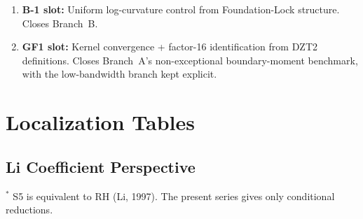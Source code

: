 \documentclass[12pt,a4paper]{article}
\theoremstyle{definition}
\theoremstyle{remark}
\begin{document}
\begin{enumerate}
  \item \textbf{B-1 slot:} Uniform log-curvature control from
    Foundation-Lock structure. Closes Branch~B.
  \item \textbf{GF1 slot:} Kernel convergence + factor-16 identification
    from DZT2 definitions. Closes Branch~A's non-exceptional
    boundary-moment benchmark, with the low-bandwidth branch kept explicit.
\end{enumerate}


\section{Localization Tables}
\label{sec:localization}

\subsection{Li Coefficient Perspective}

\begin{center}
\renewcommand{\arraystretch}{1.2}
\end{center}

{\footnotesize\noindent${}^{\ast}$ S5 is equivalent to RH (Li, 1997).
The present series gives only conditional reductions.\par}
\end{document}
